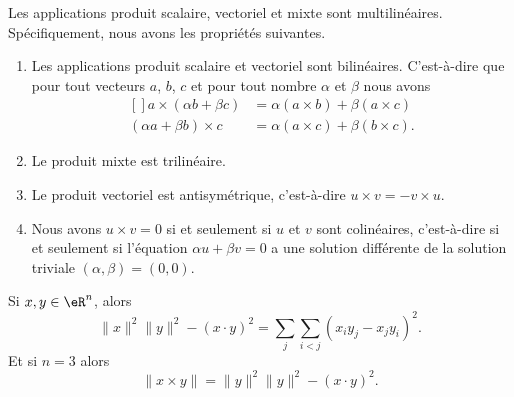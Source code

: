 \begin{proposition}		 \label{PropScalMixtLin}
	Les applications produit scalaire, vectoriel et mixte sont multilinéaires. Spécifiquement, nous avons les propriétés suivantes.
	\begin{enumerate}
		\item
			Les applications produit scalaire et vectoriel sont bilinéaires. C'est-à-dire que pour tout vecteurs $a$, $b$, $c$ et pour tout nombre $\alpha$ et $\beta$ nous avons
    \begin{equation}
        \begin{aligned}[]
            a\times (\alpha b +\beta c)&=\alpha(a\times b)+\beta(a\times c)\\
            (\alpha a+\beta b)\times c&=\alpha(a\times c)+\beta(b\times c).
        \end{aligned}
    \end{equation}

        \item
            Le produit mixte est trilinéaire.
		\item
			Le produit vectoriel est antisymétrique, c'est-à-dire $u\times v=-v\times u$.
		\item
			Nous avons $u\times v=0$ si et seulement si $u$ et $v$ sont colinéaires, c'est-à-dire si et seulement si l'équation $\alpha u+\beta v=0$ a une solution différente de la solution triviale $(\alpha,\beta)=(0,0)$.
		\end{enumerate}
\end{proposition}

\begin{proposition}     \label{PROPooMXAIooJureOD}
    Si \( x,y\in \eR^n\), alors
    \begin{equation}
        \| x \|^2\| y \|^2-(x\cdot y)^2=\sum_j\sum_{i<j}(x_iy_j-x_jy_i)^2.
    \end{equation}
    Et si \( n=3\) alors
    \begin{equation}
        \| x\times y \|=\| y \|^2\| y \|^2-(x\cdot y)^2.
    \end{equation}
\end{proposition}


